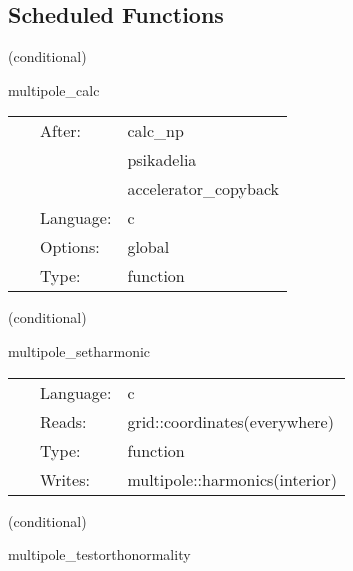 \documentclass{article}
\begin{document}
\subsection*{Scheduled Functions}
\vspace{5mm}

   (conditional) 

\hspace{5mm} multipole\_calc 

\hspace{5mm}{\it calculate multipoles } 


\hspace{5mm}

 \begin{tabular*}{160mm}{cll} 
~ & After:  & calc\_np \\ 
~& ~ &psikadelia\\ 
~& ~ &accelerator\_copyback\\ 
~ & Language:  & c \\ 
~ & Options:  & global \\ 
~ & Type:  & function \\ 
\end{tabular*} 


\vspace{5mm}

   (conditional) 

\hspace{5mm} multipole\_setharmonic 

\hspace{5mm}{\it populate grid functions with spherical harmonics } 


\hspace{5mm}

 \begin{tabular*}{160mm}{cll} 
~ & Language:  & c \\ 
~ & Reads:  & grid::coordinates(everywhere) \\ 
~ & Type:  & function \\ 
~ & Writes:  & multipole::harmonics(interior) \\ 
\end{tabular*} 


\vspace{5mm}

   (conditional) 

\hspace{5mm} multipole\_testorthonormality 

\hspace{5mm}{\it loop over modes and integrate them to check orthonormality } 
\end{document}
